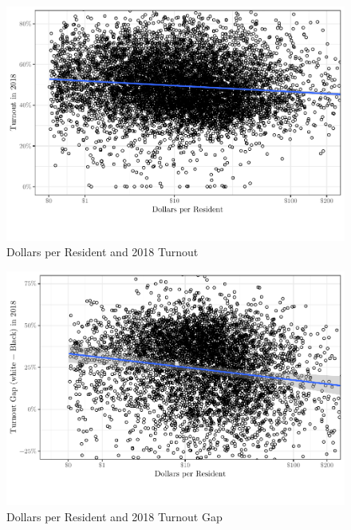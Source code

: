 \documentclass[
  12pt,
]{article}
\begin{document}
\begin{figure}[H]

{\centering \includegraphics[height=0.4\textheight]{fees_fines_to_files/figure-latex/figures-side-1} 

}

\caption{\label{fig:to}Dollars per Resident and 2018 Turnout}\label{fig:figures-side}
\end{figure}

\begin{figure}[H]

{\centering \includegraphics[height=0.4\textheight]{fees_fines_to_files/figure-latex/unnamed-chunk-1-1} 

}

\caption{\label{fig:to-gap}Dollars per Resident and 2018 Turnout Gap}\label{fig:unnamed-chunk-1}
\end{figure}

\begin{singlespace}

\end{singlespace}
\end{document}
